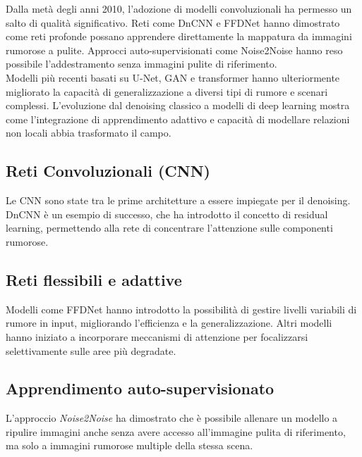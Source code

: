 \documentclass[12pt,a4paper,openright,twoside]{book}
\begin{document}
\label{sec:innovazione_denoising}
Dalla metà degli anni 2010, l'adozione di modelli convoluzionali ha permesso un salto di qualità significativo. Reti come DnCNN \parencite{zhang2017dncnn} e FFDNet \parencite{zhang2018ffdnet} hanno dimostrato come reti profonde possano apprendere direttamente la mappatura da immagini rumorose a pulite. Approcci auto-supervisionati come Noise2Noise \parencite{lehtinen2018noise2noise} hanno reso possibile l'addestramento senza immagini pulite di riferimento. \\
Modelli più recenti basati su U-Net, GAN e transformer \parencite{9010324} hanno ulteriormente migliorato la capacità di generalizzazione a diversi tipi di rumore e scenari complessi. L'evoluzione dal denoising classico a modelli di deep learning mostra come l'integrazione di apprendimento adattivo e capacità di modellare relazioni non locali abbia trasformato il campo.

\subsection*{Reti Convoluzionali (CNN)}
Le CNN sono state tra le prime architetture a essere impiegate per il denoising. DnCNN \parencite{zhang2017dncnn} è un esempio di successo, che ha introdotto il concetto di residual learning, permettendo alla rete di concentrare l'attenzione sulle componenti rumorose.

\subsection*{Reti flessibili e adattive}
Modelli come FFDNet \parencite{zhang2018ffdnet} hanno introdotto la possibilità di gestire livelli variabili di rumore in input, migliorando l'efficienza e la generalizzazione. Altri modelli hanno iniziato a incorporare meccanismi di attenzione per focalizzarsi selettivamente sulle aree più degradate.

\subsection*{Apprendimento auto-supervisionato}
L'approccio \textit{Noise2Noise} \parencite{lehtinen2018noise2noise} ha dimostrato che è possibile allenare un modello a ripulire immagini anche senza avere accesso all'immagine pulita di riferimento, ma solo a immagini rumorose multiple della stessa scena.
\end{document}
